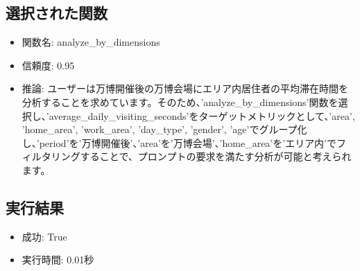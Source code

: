 \documentclass[11pt,a4paper]{article}
\begin{document}
\subsection{選択された関数}
\begin{itemize}
\item 関数名: analyze_by_dimensions
\item 信頼度: 0.95
\item 推論: ユーザーは万博開催後の万博会場にエリア内居住者の平均滞在時間を分析することを求めています。そのため、'analyze_by_dimensions'関数を選択し、'average_daily_visiting_seconds'をターゲットメトリックとして、'area', 'home_area', 'work_area', 'day_type', 'gender', 'age'でグループ化し、'period'を'万博開催後'、'area'を'万博会場'、'home_area'を'エリア内'でフィルタリングすることで、プロンプトの要求を満たす分析が可能と考えられます。
\end{itemize}

\subsection{実行結果}
\begin{itemize}
\item 成功: True
\item 実行時間: 0.01秒
\end{itemize}
\end{document}
